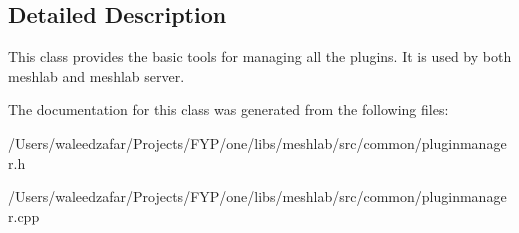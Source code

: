 \subsection{Detailed Description}
This class provides the basic tools for managing all the plugins. It is used by both meshlab and meshlab server. 

The documentation for this class was generated from the following files\+:\begin{DoxyCompactItemize}
\item 
/\+Users/waleedzafar/\+Projects/\+F\+Y\+P/one/libs/meshlab/src/common/pluginmanager.\+h\item 
/\+Users/waleedzafar/\+Projects/\+F\+Y\+P/one/libs/meshlab/src/common/pluginmanager.\+cpp\end{DoxyCompactItemize}
